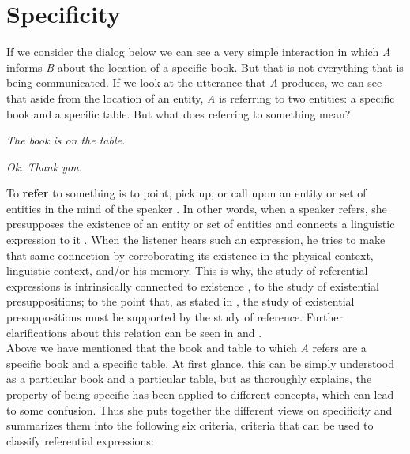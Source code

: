 \section{Specificity}
\label{sect:spec}

If we consider the dialog below we can see a very simple interaction in which \textit{A} informs \textit{B} about the location of a specific book. But that is not everything that is being communicated. If we look at the utterance that \textit{A} produces, we can see that aside from the location of an entity, \textit{A} is referring to two entities: a specific book and a specific table. But what does referring to something mean?\\  

\begin{exe}
  \ex\label{ex:dialog}
  \begin{xlistA}
    \item \textit{The book is on the table.}
    \item \textit{Ok. Thank you.}
  \end{xlistA}
\end{exe}

To \textbf{refer} to something is to point, pick up, or call upon an entity or set of entities \citep{lyons1995linguistic} in the mind of the speaker \citep{caudet1999expresiones}. In other words, when a speaker refers, she presupposes the existence of an entity or set of entities and connects a linguistic expression to it \citep{garcia1998presuposiciones}. When the listener hears such an expression, he tries to make that same connection by corroborating its existence in the physical context, linguistic context, and/or his memory. This is why, the study of referential expressions is intrinsically connected to existence \citep{lyons1995linguistic}, to the study of existential presuppositions; to the point that, as stated in \citet{garcia1998presuposiciones}, the study of existential presuppositions must be supported by the study of reference. Further clarifications about this relation can be seen in \citet{lyons1995linguistic,garcia1998presuposiciones} and \citet{herrasti2011caracteristicas}.\\

Above we have mentioned that the book and table to which \textit{A} refers are a specific book and a specific table. At first glance, this can be simply understood as a particular book and a particular table, but as \citet{caudet1999expresiones} thoroughly explains, the property of being specific has been applied to different concepts, which can lead to some confusion. Thus she puts together the different views on specificity and summarizes them into the following six criteria, criteria that can be used to classify referential expressions:\\

